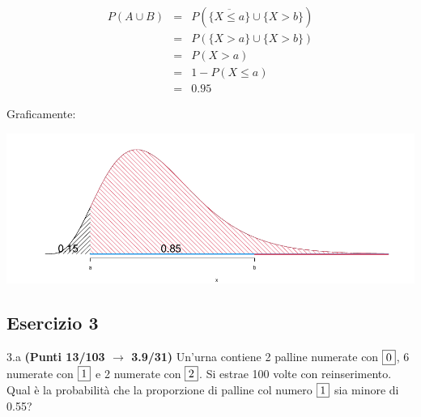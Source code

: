 \documentclass[
  11pt,
]{book}
\theoremstyle{mytheoremstyle}
\theoremstyle{mydefstyle}
\newenvironment{sol}
  {
  \begin{tcolorbox}[enhanced,breakable,arc=0.1mm,boxrule=1pt,colback=white,colframe=iblue,
  title=\bf \fontfamily{lmss}\selectfont \hspace{.5 cm} Soluzione,drop fuzzy shadow]

}{
\end{tcolorbox}
  }
\begin{document}
\begin{sol}

\begin{eqnarray*}
P( A\cup  B) &=& P(\overline{\{X\le a\}}\cup\{X > b\})\\
             &=& P(\{X> a\}\cup\{X > b\})\\
             &=& P(X> a)\\
             &=& 1-P(X\le a)\\
             &=& 0.95
\end{eqnarray*}

Graficamente:

\begin{center}\includegraphics{Esami_passati_con_soluzioni_files/figure-latex/unnamed-chunk-104-1} \end{center}

\end{sol}

\subsection{Esercizio 3}\label{esercizio-3-50}

3.a \textbf{(Punti 13/103 \(\rightarrow\) 3.9/31)} Un'urna contiene 2 palline numerate con \(\fbox{0}\), 6 numerate con \(\fbox{1}\) e 2 numerate con \(\fbox{2}\). Si estrae 100 volte con reinserimento. Qual è la probabilità che la proporzione di palline col numero \(\fbox{1}\) sia minore di 0.55?
\end{document}
